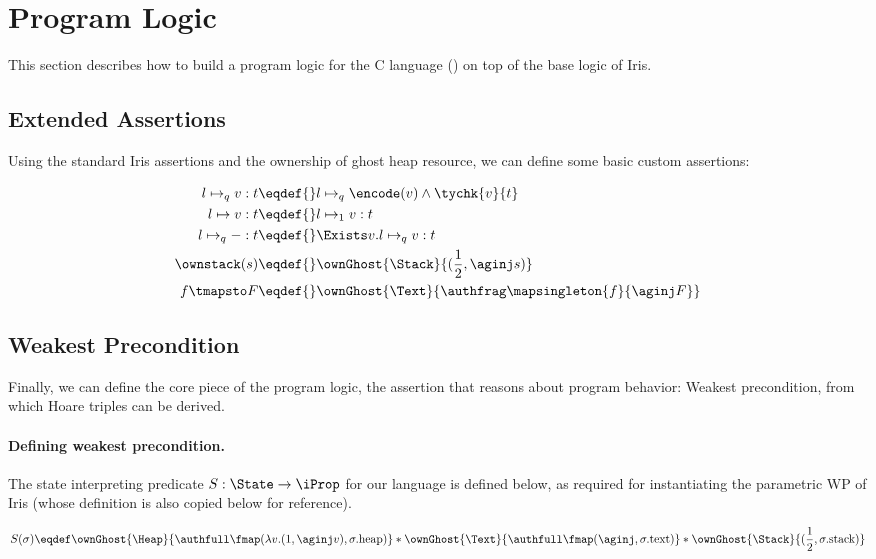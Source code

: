 \section{Program Logic}
\label{sec:program-logic}

This section describes how to build a program logic for the C language (\cf {}) on top of the base logic of Iris.

\subsection{Extended Assertions}

Using the standard Iris assertions and the ownership of ghost heap resource, we can define some basic custom assertions:

\begin{align*}
l \mapsto_q v : t \eqdef{}&  l \mapsto_q \encode(v) \land \tychk{v}{t} \\
l \mapsto v : t              \eqdef{}& l \mapsto_1 v : t\\
l \mapsto_q - : t            \eqdef{}& \Exists v. l \mapsto_q v : t\\
\ownstack(s) \eqdef{}& \ownGhost{\Stack}{(\frac12, \aginj s)} \\
f \tmapsto F \eqdef{}& \ownGhost{\Text}{\authfrag \mapsingleton{f}{\aginj F}}
\end{align*}

\subsection{Weakest Precondition}

Finally, we can define the core piece of the program logic, the assertion that reasons about program behavior:
Weakest precondition, from which Hoare triples can be derived.

\paragraph{Defining weakest precondition.}

The state interpreting predicate $S : \State \to \iProp$ for our \irisc{} language is defined below, as required for
instantiating the parametric WP of Iris (whose definition is also copied below for reference).

\[S(\sigma) \eqdef 
  \ownGhost{\Heap}{\authfull \fmap (\lambda v. (1, \aginj v), \sigma.\text{heap})} *
  \ownGhost{\Text}{\authfull \fmap (\aginj, \sigma.\text{text})} *
  \ownGhost{\Stack}{(\frac12, \sigma.\text{stack})}
\]

